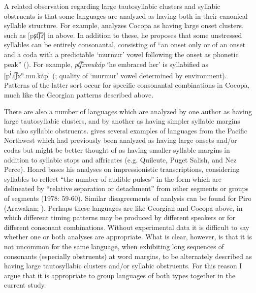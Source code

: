   A related observation regarding large tautosyllabic clusters and syllabic obstruents is that some languages are analyzed as having both in their canonical syllable structure. For example, \citet{Crawford1966} analyzes Cocopa as having large onset clusters, such as [pʂt͡ʃʔ] in  above. In addition to these, he proposes that some unstressed syllables can be entirely consonantal, consisting of “an onset only or of an onset and a coda with a predictable ‘murmur’ vowel following the onset as phonetic peak” (\citeyear[34]{Crawford1966}). For example, \textit{pt͡ʃxmukáp} ‘he embraced her’ is syllabified as [p\textsuperscript{i}.t͡ʃx\textsuperscript{a}.mu.káp]  (\citeyear[43]{Crawford1966}; quality of ‘murmur’ vowel determined by environment). Patterns of the latter sort occur for specific consonantal combinations in Cocopa, much like the Georgian patterns described above. 

  There are also a number of languages which are analyzed by one author as having large tautosyllabic clusters, and by another as having simpler syllable margins but also syllabic obstruents. \citet{Hoard1978} gives several examples of languages from the Pacific Northwest which had previously been analyzed as having large onsets and/or codas but might be better thought of as having smaller syllable margins in addition to syllabic stops and affricates (e.g. Quileute, Puget Salish, and Nez Perce). Hoard bases his analyses on impressionistic transcriptions, considering syllables to reflect “the number of audible pulses” in the form which are delineated by “relative separation or detachment” from other segments or groups of segments (1978: 59-60). Similar disagreements of analysis can be found for Piro (Arawakan; \citealt{Matteson1965,Lin1997,Hanson2010}). Perhaps these languages are like Georgian and Cocopa above, in which different timing patterns may be produced by different speakers or for different consonant combinations. Without experimental data it is difficult to say whether one or both analyses are appropriate. What is clear, however, is that it is not uncommon for the same language, when exhibiting long sequences of consonants (especially obstruents) at word margins, to be alternately described as having large tautosyllabic clusters and/or syllabic obstruents. For this reason I argue that it is appropriate to group languages of both types together in the current study.

